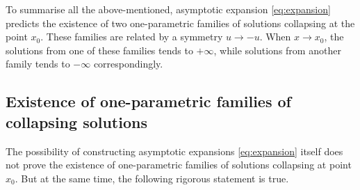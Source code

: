 To summarise all the above-mentioned, asymptotic expansion \eqref{eq:expansion} predicts the existence of two one-parametric families of solutions collapsing at the point $x_0$.
These families are related by a symmetry $u \to -u$.
When $x \to x_0$, the solutions from one of these families tends to $+\infty$, while solutions from another family tends to $-\infty$ correspondingly.

\subsection{Existence of one-parametric families of collapsing solutions}

The possibility of constructing asymptotic expansions \eqref{eq:expansion} itself does not prove the existence of one-parametric families of solutions collapsing at point $x_0$.
But at the same time, the following rigorous statement is true.

